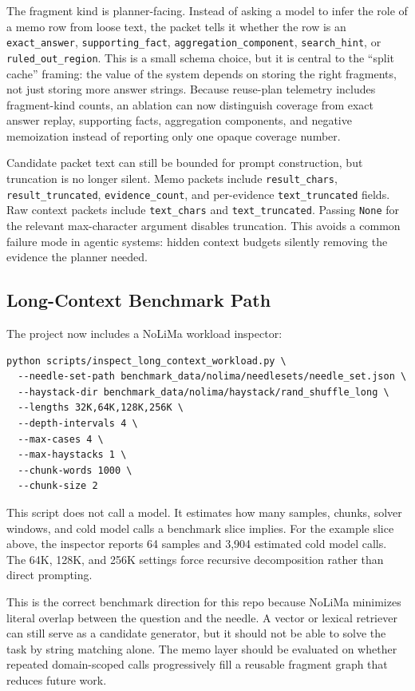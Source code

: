 \documentclass[11pt]{article}
\begin{document}
The fragment kind is planner-facing. Instead of asking a model to infer the
role of a memo row from loose text, the packet tells it whether the row is an
\texttt{exact\_answer}, \texttt{supporting\_fact},
\texttt{aggregation\_component}, \texttt{search\_hint}, or
\texttt{ruled\_out\_region}. This is a small schema choice, but it is central
to the ``split cache'' framing: the value of the system depends on storing the
right fragments, not just storing more answer strings.
Because reuse-plan telemetry includes fragment-kind counts, an ablation can
now distinguish coverage from exact answer replay, supporting facts,
aggregation components, and negative memoization instead of reporting only one
opaque coverage number.

Candidate packet text can still be bounded for prompt construction, but
truncation is no longer silent. Memo packets include
\texttt{result\_chars}, \texttt{result\_truncated},
\texttt{evidence\_count}, and per-evidence \texttt{text\_truncated} fields.
Raw context packets include \texttt{text\_chars} and
\texttt{text\_truncated}. Passing \texttt{None} for the relevant max-character
argument disables truncation. This avoids a common failure mode in agentic
systems: hidden context budgets silently removing the evidence the planner
needed.

\subsection{Long-Context Benchmark Path}

The project now includes a NoLiMa workload inspector:

\begin{verbatim}
python scripts/inspect_long_context_workload.py \
  --needle-set-path benchmark_data/nolima/needlesets/needle_set.json \
  --haystack-dir benchmark_data/nolima/haystack/rand_shuffle_long \
  --lengths 32K,64K,128K,256K \
  --depth-intervals 4 \
  --max-cases 4 \
  --max-haystacks 1 \
  --chunk-words 1000 \
  --chunk-size 2
\end{verbatim}

This script does not call a model. It estimates how many samples, chunks,
solver windows, and cold model calls a benchmark slice implies. For the example
slice above, the inspector reports 64 samples and 3,904 estimated cold model
calls. The 64K, 128K, and 256K settings force recursive decomposition rather
than direct prompting.

This is the correct benchmark direction for this repo because NoLiMa
\cite{modarressi2025nolima} minimizes
literal overlap between the question and the needle. A vector or lexical
retriever can still serve as a candidate generator, but it should not be able
to solve the task by string matching alone. The memo layer should be evaluated
on whether repeated domain-scoped calls progressively fill a reusable fragment
graph that reduces future work.
\end{document}
